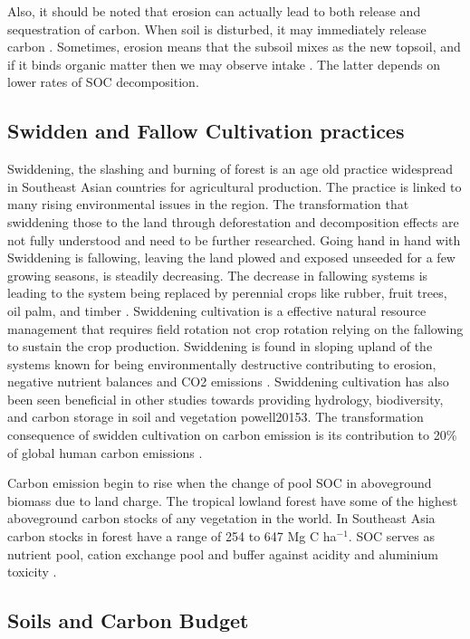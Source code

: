 Also, it should be noted that erosion can actually lead to both release and sequestration of carbon. When soil is disturbed, it may immediately release carbon \citep{berhe2007significance}. Sometimes, erosion means that the subsoil mixes as the new topsoil, and if it binds organic matter then we may observe intake \citep{harden1999dynamic}. The latter depends on lower rates of SOC decomposition.

\subsection{Swidden and Fallow Cultivation practices}

Swiddening, the slashing and burning of forest is an age old practice widespread in Southeast Asian countries for agricultural production. The practice is linked to many rising environmental issues in the region. The transformation that swiddening those to the land through deforestation and decomposition effects are not fully understood and need to be further researched. Going hand in hand with Swiddening is fallowing, leaving the land plowed and exposed unseeded for a few growing seasons, is steadily decreasing. The decrease in fallowing systems is leading to the system being replaced by perennial crops like rubber, fruit trees, oil palm, and timber \citep{schmidt2009assessment}. Swiddening cultivation is a effective natural resource management that requires field rotation not crop rotation relying on the fallowing to sustain the crop production. Swiddening is found in sloping upland of the systems known for being environmentally destructive contributing to erosion, negative nutrient balances and CO2 emissions \citep{de2008soil}. Swiddening cultivation has also been seen beneficial in other studies towards providing hydrology, biodiversity, and carbon storage in soil and vegetation {powell20153}. The transformation consequence of swidden cultivation on carbon emission is its contribution to 20\% of global human carbon emissions \citep{meehl2007global}.

Carbon emission begin to rise when the change of pool SOC in aboveground biomass due to land charge. The tropical lowland forest have some of the highest aboveground carbon stocks of any vegetation in the world. In Southeast Asia carbon stocks in forest have a range of 254 to 647 Mg C ha$^{-1}$. SOC serves as nutrient pool, cation exchange pool and buffer against acidity and aluminium toxicity \citep{silver2000potential}. 

\subsection{Soils and Carbon Budget}

